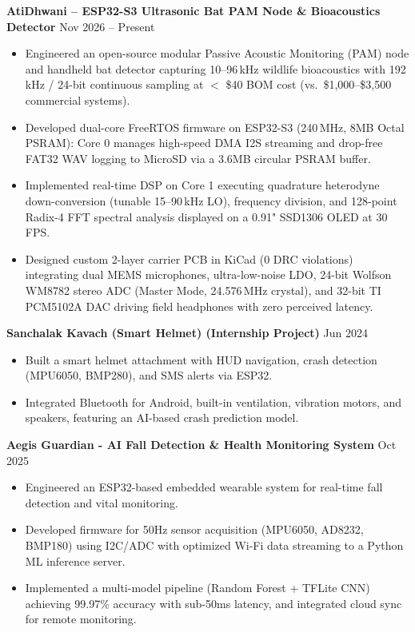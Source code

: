 \documentclass[10pt,a4paper]{article}%
\begin{document}
\noindent \textbf{AtiDhwani -- ESP32-S3 Ultrasonic Bat PAM Node \& Bioacoustics Detector} \hfill Nov 2026 -- Present%
\begin{itemize}[leftmargin=15pt, nosep, topsep=0pt]%
\item Engineered an open-source modular Passive Acoustic Monitoring (PAM) node and handheld bat detector capturing 10--96\,kHz wildlife bioacoustics with 192\,kHz / 24-bit continuous sampling at $<$ \$40 BOM cost (vs.\ \$1,000--\$3,500 commercial systems).%
\item Developed dual-core FreeRTOS firmware on ESP32-S3 (240\,MHz, 8MB Octal PSRAM): Core 0 manages high-speed DMA I2S streaming and drop-free FAT32 WAV logging to MicroSD via a 3.6MB circular PSRAM buffer.%
\item Implemented real-time DSP on Core 1 executing quadrature heterodyne down-conversion (tunable 15--90\,kHz LO), frequency division, and 128-point Radix-4 FFT spectral analysis displayed on a 0.91" SSD1306 OLED at 30\,FPS.%
\item Designed custom 2-layer carrier PCB in KiCad (0 DRC violations) integrating dual MEMS microphones, ultra-low-noise LDO, 24-bit Wolfson WM8782 stereo ADC (Master Mode, 24.576\,MHz crystal), and 32-bit TI PCM5102A DAC driving field headphones with zero perceived latency.%
\end{itemize} \vspace{8pt}

\noindent \textbf{Sanchalak Kavach (Smart Helmet) (Internship Project)} \hfill Jun 2024%
\begin{itemize}[leftmargin=15pt, nosep, topsep=0pt]%
\item Built a smart helmet attachment with HUD navigation, crash detection (MPU6050, BMP280), and SMS alerts via ESP32.%
\item Integrated Bluetooth for Android, built-in ventilation, vibration motors, and speakers, featuring an AI-based crash prediction model.%
\end{itemize} \vspace{8pt}

\noindent \textbf{Aegis Guardian - AI Fall Detection \& Health Monitoring System} \hfill Oct 2025%
\begin{itemize}[leftmargin=15pt, nosep, topsep=0pt]%
\item Engineered an ESP32-based embedded wearable system for real-time fall detection and vital monitoring.%
\item Developed firmware for 50Hz sensor acquisition (MPU6050, AD8232, BMP180) using I2C/ADC with optimized Wi-Fi data streaming to a Python ML inference server.%
\item Implemented a multi-model pipeline (Random Forest + TFLite CNN) achieving 99.97\% accuracy with sub-50ms latency, and integrated cloud sync for remote monitoring.%
\end{itemize} \vspace{8pt}
\end{document}
